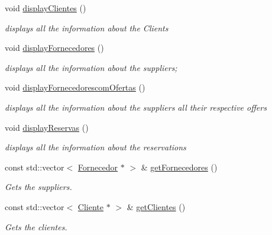 \begin{DoxyCompactItemize}
\mbox{\label{classEmpresa_a28e04d59daa7206bec6055249ce17410}} 
void \hyperlink{classEmpresa_a28e04d59daa7206bec6055249ce17410}{display\+Clientes} ()
\begin{DoxyCompactList}\small\item\em displays all the information about the Clients \end{DoxyCompactList}\item 
\mbox{\label{classEmpresa_a55c3756c01b45b41ad03f4e4f3e4dcac}} 
void \hyperlink{classEmpresa_a55c3756c01b45b41ad03f4e4f3e4dcac}{display\+Fornecedores} ()
\begin{DoxyCompactList}\small\item\em displays all the information about the suppliers; \end{DoxyCompactList}\item 
\mbox{\label{classEmpresa_aa47e9a64800a41180b7f374b73a1f32b}} 
void \hyperlink{classEmpresa_aa47e9a64800a41180b7f374b73a1f32b}{display\+Fornecedorescom\+Ofertas} ()
\begin{DoxyCompactList}\small\item\em displays all the information about the suppliers all their respective offers \end{DoxyCompactList}\item 
\mbox{\label{classEmpresa_a8c89e6053eaccf0e1938a4f2ab0bfdc4}} 
void \hyperlink{classEmpresa_a8c89e6053eaccf0e1938a4f2ab0bfdc4}{display\+Reservas} ()
\begin{DoxyCompactList}\small\item\em displays all the information about the reservations \end{DoxyCompactList}\item 
const std\+::vector$<$ \hyperlink{classFornecedor}{Fornecedor} $\ast$ $>$ \& \hyperlink{classEmpresa_aaf131a375aa70819205744328a4dbc07}{get\+Fornecedores} ()
\begin{DoxyCompactList}\small\item\em Gets the suppliers. \end{DoxyCompactList}\item 
const std\+::vector$<$ \hyperlink{classCliente}{Cliente} $\ast$ $>$ \& \hyperlink{classEmpresa_a472beae89ee1187e1ec3f70e9d4a99ef}{get\+Clientes} ()
\begin{DoxyCompactList}\small\item\em Gets the clientes. \end{DoxyCompactList}\item 

\end{DoxyCompactItemize}
